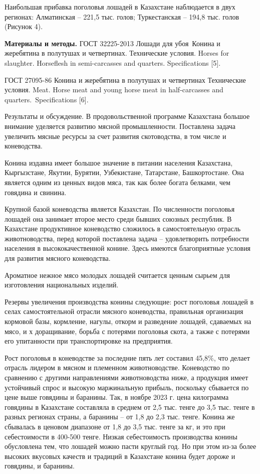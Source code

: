 \begin{multicols}{2}

Наибольшая прибавка поголовья лошадей в Казахстане наблюдается в двух
регионах: Алматинская -- 221,5 тыс. голов; Туркестанская -- 194,8 тыс.
голов (Рисунок 4).

{\bfseries Материалы и методы.} ГОСТ 32225-2013 Лошади для убоя~Конина и
жеребятина в полутушах и четвертинах. Технические условия. Horses for
slaughter. Horseflesh in semi-carcasses and quarters. Specifications
{[}5{]}.

ГОСТ 27095-86 Конина и жеребятина в полутушах и четвертинах Технические
условия. Meat. Horse meat and young horse meat in half-carcasses and
quarters.~Specifications {[}6{]}.

Результаты и обсуждение. В продовольственной программе Казахстана
большое внимание уделяется развитию мясной промышленности. Поставлена
задача увеличить мясные ресурсы за счет развития скотоводства, в том
числе и коневодства.

Конина издавна имеет большое значение в питании населения Казахстана,
Кыргызстане, Якутии, Бурятии, Узбекистане, Татарстане, Башкортостане.
Она является одним из ценных видов мяса, так как более богата белками,
чем говядина и свинина.

Крупной базой коневодства является Казахстан. По численности поголовья
лошадей она занимает второе место среди бывших союзных республик. В
Казахстане продуктивное коневодство сложилось в самостоятельную отрасль
животноводства, перед которой поставлена задача -- удовлетворить
потребности населения в высококачественной конине. Здесь имеются
благоприятные условия для развития мясного коневодства.

Ароматное нежное мясо молодых лошадей считается ценным сырьем для
изготовления национальных изделий.

Резервы увеличения производства конины следующие: рост поголовья лошадей
в селах самостоятельной отрасли мясного коневодства, правильная
организация кормовой базы, кормление, нагулы, откорм и разведение
лошадей, сдаваемых на мясо, и х доращивание, борьба с потерями поголовья
скота, а также с потерями его упитанности при транспортировке на
предприятия.

Рост поголовья в коневодстве за последние пять лет составил 45,8\%, что
делает отрасль лидером в мясном и племенном животноводстве. Коневодство
по сравнению с другими направлениями животноводства ниже, а продукция
имеет устойчивый спрос и высокую маржинальную прибыль, поскольку
сбывается по цене выше говядины и баранины. Так, в ноябре 2023 г. цена
килограмма говядины в Казахстане составляла в среднем от 2,5 тыс. тенге
до 3,5 тыс. тенге в разных регионах страны, а баранины -- от 1,8 до 2,3
тыс. тенге. Конина же сбывалась в ценовом диапазоне от 1,8 до 3,5 тыс.
тенге за кг, и это при себестоимости в 400-500 тенге. Низкая
себестоимость производства конины обусловлена тем, что лошадей можно
пасти круглый год. Но при этом из-за более высоких вкусовых качеств и
традиций в Казахстане конина будет дороже и говядины, и баранины.


\end{multicols}

